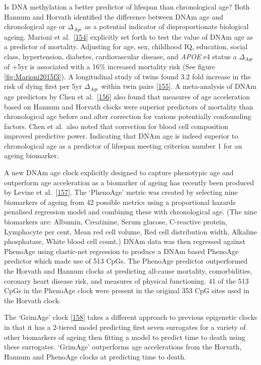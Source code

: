 \documentclass[
]{book}
\begin{document}
Is DNA methylation a better predictor of lifespan than chronological age?
Both Hannum and Horvath identified the difference between DNAm age and chronological age or \(\Delta_{Age}\) as a potential indicator of disproportionate biological ageing.
Marioni et al.~{[}\protect\hyperlink{ref-Marioni2015}{154}{]} explicitly set forth to test the value of DNAm age as a predictor of mortality.
Adjusting for age, sex, childhood IQ, education, social class, hypertension, diabetes, cardiovascular disease, and \emph{APOE} e4 status a \(\Delta_{Age}\) of +5yr is associated with a 16\% increased mortality risk (See figure \ref{fig:Marioni2015f3}).
A longitudinal study of twins found 3.2 fold increase in the risk of dying first per 5yr \(\Delta_{Age}\) within twin pairs {[}\protect\hyperlink{ref-Christiansen2016}{155}{]}.
A meta-analysis of DNAm age predictors by Chen et al.~{[}\protect\hyperlink{ref-Chen2016a}{156}{]} also found that measures of age acceleration based on Hannum and Horvath clocks were superior predictors of mortality than chronological age before and after correction for various potentially confounding factors.
Chen et al.~also noted that correction for blood cell composition improved predictive power.
Indicating that DNAm age is indeed superior to chronological age as a predictor of lifespan meeting criterion number 1 for an ageing biomarker.

A new DNAm age clock explicitly designed to capture phenotypic age and outperform age acceleration as a biomarker of ageing has recently been produced by Levine et al.~{[}\protect\hyperlink{ref-Levine2018}{157}{]}.
The `PhenoAge' metric was created by selecting nine biomarkers of ageing from 42 possible metrics using a proportional hazards penalised regression model and combining these with chronological age.
(The nine biomarkers are: Albumin, Creatinine, Serum glucose, C-reactive protein, Lymphocyte per cent, Mean red cell volume, Red cell distribution width, Alkaline phosphatase, White blood cell count.)
DNAm data was then regressed against PhenoAge using elastic-net regression to produce a DNAm based PhenoAge predictor which made use of 513 CpGs.
The PhenoAge predictor outperformed the Horvath and Hannum clocks at predicting all-cause mortality, comorbidities, coronary heart disease risk, and measures of physical functioning.
41 of the 513 CpGs in the PhenoAge clock were present in the original 353 CpG sites used in the Horvath clock.

The `GrimAge' clock {[}\protect\hyperlink{ref-Lu2019}{158}{]} takes a different approach to previous epigenetic clocks in that it has a 2-tiered model predicting first seven surrogates for a variety of other biomarkers of ageing then fitting a model to predict time to death using these surrogates.
`GrimAge' outperforms age accelerations from the Horvath, Hannum and PhenoAge clocks at predicting time to death.
\end{document}
